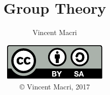 

\usepackage{csquotes}

\title{Group Theory}
\author{Vincent Macri}
\date{\includegraphics{../LicenseLogo}\\\copyright{} Vincent Macri, 2017}


	\frame{\titlepage}
	
	
	
	


